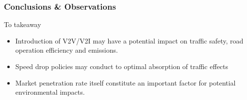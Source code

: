 \begin{frame}
    \frametitle{Conclusions \& Observations}
    \begin{block}{To takeaway}
    \begin{itemize}
        \item Introduction of V2V/V2I may have a potential impact on traffic safety, road operation efficiency and emissions.
        \item Speed drop policies may conduct to optimal absorption of traffic effects
        \item Market penetration rate itself constitute an important factor for potential environmental impacts. 
    \end{itemize}
    \end{block}
\end{frame}
